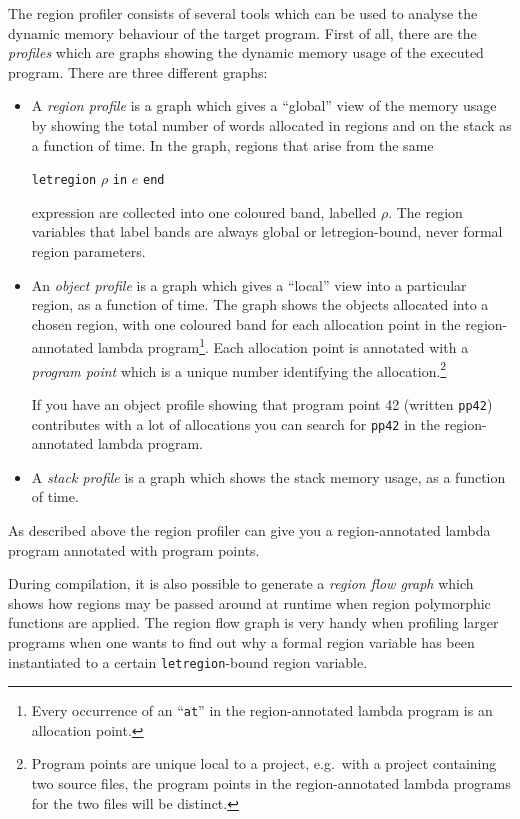 \documentclass[12pt]{book}
\begin{document}
The region profiler consists of several tools which can be used to analyse
the dynamic memory behaviour of the target program. First of all, there are
the \emph{profiles} which are graphs showing the dynamic
memory usage of the executed program. There are three different graphs:
\begin{itemize}
\item A \emph{region profile} is a graph which gives
  a ``global'' view of the memory usage by showing the total number of
  words allocated in regions and on the stack as a function of time. In the
  graph, regions that arise from the same
\begin{center}
\texttt{letregion} $\rho$ \texttt{in} $e$ \texttt{end}
\end{center}
expression are collected into one coloured band, labelled $\rho$. The
region variables that label bands are always global or letregion-bound,
never formal region parameters.

\item An \emph{object profile} is a graph which gives
  a ``local'' view into a particular region, as a function of time. The
  graph shows the objects allocated into a chosen region, with one coloured
  band for each allocation point in the region-annotated lambda
  program\footnote{Every occurrence of an ``\texttt{at}'' in the
    region-annotated lambda program is an allocation point.}.  Each
  allocation point is annotated with a \emph{program point} which is a unique number identifying the
  allocation.\footnote{Program points are unique local to a project, e.g.\ 
    with a project containing two source files, 
    the program points in the region-annotated lambda
    programs for the two files will be distinct.}
  
  If you have an object profile showing that program point 42
  (written \texttt{pp42}) contributes with a lot of allocations you
  can search for \texttt{pp42} in the region-annotated lambda
  program.
\item A \emph{stack profile} is a graph which shows
  the stack memory usage, as a function of time.
\end{itemize}

As described above the region profiler can give you a region-annotated
lambda program annotated with program points.
  
During compilation, it is also possible to generate a \emph{region flow
  graph}\index{region flow graph} which shows how
regions may be passed around at runtime when region polymorphic functions
are applied. The region flow graph is very handy when profiling larger
programs when one wants to find out why a formal region variable has been
instantiated to a certain \texttt{letregion}-bound region variable.
\end{document}
